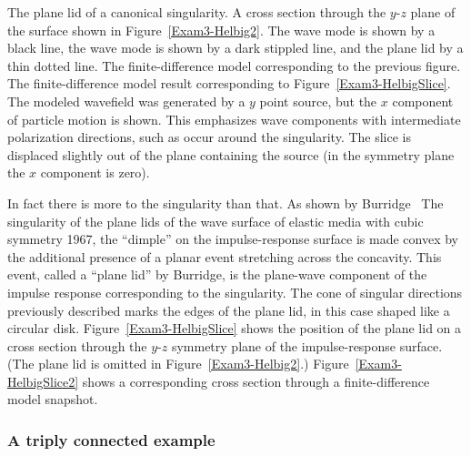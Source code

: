 %
%
{The plane lid of a canonical singularity.}
{
A cross section through the $y$-$z$ plane of the surface shown in
Figure~\protect\ref{Exam3-Helbig2}.
The {} wave mode is shown by a black line,
the {} wave mode is shown by a dark stippled line,
and the plane lid by a thin dotted line.
}
{The finite-difference model corresponding to the previous figure.}
{
The finite-difference model result corresponding
to Figure~\protect\ref{Exam3-HelbigSlice}.
The modeled wavefield was generated by a $y$ point source,
but the $x$ component of particle motion is shown.
This emphasizes wave components with intermediate polarization
directions, such as occur around the singularity.
The slice is displaced slightly out of the plane
containing the source (in the symmetry plane the $x$ component
is zero).
}

In fact there is more to the singularity than that.
As shown by Burridge~
{The singularity of the plane lids of the wave surface of elastic media with cubic symmetry}
{1967},
the ``dimple'' on the impulse-response surface
is made convex by the additional presence of a planar event
stretching across the concavity.
This event, called a ``plane lid'' by Burridge, 
is the plane-wave component of the impulse response
corresponding to the singularity.
The cone of singular directions previously described marks the edges
of the plane lid, in this case shaped like a circular disk.
Figure~\ref{Exam3-HelbigSlice} shows the position of the plane lid
on a cross section through the $y$-$z$ symmetry plane
of the impulse-response surface.
(The plane lid is omitted in Figure~\ref{Exam3-Helbig2}.)
Figure~\ref{Exam3-HelbigSlice2} shows a corresponding
cross section through a finite-difference model snapshot.

\subsubsection{A triply connected example}

